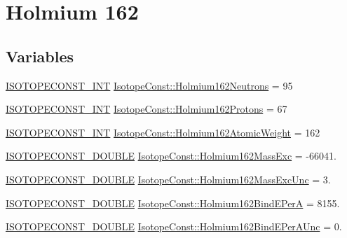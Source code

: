 \hypertarget{group___isotope_const-_holmium-_ho162}{}\section{Holmium 162}
\label{group___isotope_const-_holmium-_ho162}
\subsection*{Variables}
\begin{DoxyCompactItemize}
\item 
\mbox{\hyperlink{group___isotope_const-_macros_ga5f18360b3e99483a35c32d789e62621c}{I\+S\+O\+T\+O\+P\+E\+C\+O\+N\+S\+T\+\_\+\+I\+NT}} \mbox{\hyperlink{group___isotope_const-_holmium-_ho162_gaeda2babc0533576dd97e81556ee5caa9}{Isotope\+Const\+::\+Holmium162\+Neutrons}} = 95
\item 
\mbox{\hyperlink{group___isotope_const-_macros_ga5f18360b3e99483a35c32d789e62621c}{I\+S\+O\+T\+O\+P\+E\+C\+O\+N\+S\+T\+\_\+\+I\+NT}} \mbox{\hyperlink{group___isotope_const-_holmium-_ho162_ga0352eae3823d1e5e9c8a71739d08b44c}{Isotope\+Const\+::\+Holmium162\+Protons}} = 67
\item 
\mbox{\hyperlink{group___isotope_const-_macros_ga5f18360b3e99483a35c32d789e62621c}{I\+S\+O\+T\+O\+P\+E\+C\+O\+N\+S\+T\+\_\+\+I\+NT}} \mbox{\hyperlink{group___isotope_const-_holmium-_ho162_ga332912b734b8a51b4105171c8634edb4}{Isotope\+Const\+::\+Holmium162\+Atomic\+Weight}} = 162
\item 
\mbox{\hyperlink{group___isotope_const-_macros_ga8f45a7272ce02c0b4c65c44636ed719a}{I\+S\+O\+T\+O\+P\+E\+C\+O\+N\+S\+T\+\_\+\+D\+O\+U\+B\+LE}} \mbox{\hyperlink{group___isotope_const-_holmium-_ho162_ga2e2c7cc536c84fe8b903e67c0681825d}{Isotope\+Const\+::\+Holmium162\+Mass\+Exc}} = -\/66041.
\item 
\mbox{\hyperlink{group___isotope_const-_macros_ga8f45a7272ce02c0b4c65c44636ed719a}{I\+S\+O\+T\+O\+P\+E\+C\+O\+N\+S\+T\+\_\+\+D\+O\+U\+B\+LE}} \mbox{\hyperlink{group___isotope_const-_holmium-_ho162_gae395df2378aa68a8f8669104416e4e26}{Isotope\+Const\+::\+Holmium162\+Mass\+Exc\+Unc}} = 3.
\item 
\mbox{\hyperlink{group___isotope_const-_macros_ga8f45a7272ce02c0b4c65c44636ed719a}{I\+S\+O\+T\+O\+P\+E\+C\+O\+N\+S\+T\+\_\+\+D\+O\+U\+B\+LE}} \mbox{\hyperlink{group___isotope_const-_holmium-_ho162_ga19b1e0c5080907f47b3ea61cf8ce3e09}{Isotope\+Const\+::\+Holmium162\+Bind\+E\+PerA}} = 8155.
\item 
\mbox{\hyperlink{group___isotope_const-_macros_ga8f45a7272ce02c0b4c65c44636ed719a}{I\+S\+O\+T\+O\+P\+E\+C\+O\+N\+S\+T\+\_\+\+D\+O\+U\+B\+LE}} \mbox{\hyperlink{group___isotope_const-_holmium-_ho162_gad305be28c093b0988970bfcb3268cf39}{Isotope\+Const\+::\+Holmium162\+Bind\+E\+Per\+A\+Unc}} = 0.

\end{DoxyCompactItemize}
